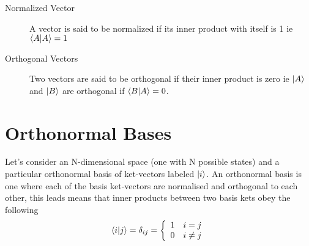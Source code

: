 \documentclass[12pt,a5paper]{article}
\begin{document}
\begin{description}
    \item[Normalized Vector] A vector is said to be normalized if its inner product with itself is 1 ie $\braket{A}{A}=1$
    \item[Orthogonal Vectors] Two vectors are said to be orthogonal if their inner product is zero ie $\ket{A}$ and $\ket{B}$ are orthogonal if $\braket{B}{A}=0$.
\end{description}

\section{Orthonormal Bases}
Let's consider an N-dimensional space (one with N possible states) and a particular orthonormal basis of ket-vectors labeled $\ket{i}$. An orthonormal basis is one where each of the basis ket-vectors are normalised and orthogonal to each other, this leads means that inner products between two basis kets obey the following
\begin{equation}
\braket{i}{j} =\delta_{ij}= \left\{ \begin{array}{ll}
1 & i = j \\
0 & i \neq j
\end{array}\right.
\end{equation}
\end{document}
